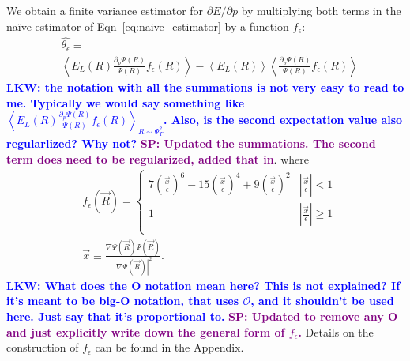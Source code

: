 \documentclass[twocolumn]{revtex4-1}
\newcommand{\lucas}[1]{\textbf{\textcolor{blue}{LKW: #1}}}
\newcommand{\shivesh}[1]{\textbf{\textcolor{purple}{SP: #1}}}
\begin{document}
We obtain a finite variance estimator for $\partial E/\partial p$ by multiplying both terms in the na\"ive estimator of Eqn~\ref{eq:naive_estimator} by a function $f_\epsilon$:
\begin{equation}
\begin{split}
&\hat{\theta_\epsilon} \equiv \\ 
&\left\langle E_L(R) \frac{\partial_p \Psi(R)}{\Psi(R)} f_\epsilon(R) \right\rangle - \left\langle E_L(R) \right \rangle \left \langle \frac{\partial_p \Psi(R)}{\Psi(R)} f_\epsilon(R) \right\rangle
\label{eq:regularized_estimator}
\end{split}
\end{equation}
\lucas{the notation with all the summations is not very easy to read to me. Typically we would say something like $\left\langle E_L(R) \frac{\partial_p \Psi(R)}{\Psi(R)} f_\epsilon(R) \right\rangle_{R\sim\Psi_T^2}$. Also, is the second expectation value also regularlized? Why not?}
\shivesh{Updated the summations. The second term does need to be regularized, added that in}.
where 
\begin{equation}
\begin{split}
&f_\epsilon(\vec{R}) = \begin{cases} 
     7(\frac{\vec{x}}{\epsilon})^6 - 15(\frac{\vec{x}}{\epsilon})^4 + 9(\frac{\vec{x}}{\epsilon})^2 & |\frac{\vec{x}}{\epsilon}| < 1 \\
      1 & |\frac{\vec{x}}{\epsilon}| \ge 1 \\
   \end{cases}\\ 
 &\vec{x} \equiv \frac{\nabla \Psi(\vec{R}) \Psi(\vec{R})}{|\nabla \Psi(\vec{R})|^2}.
\end{split}
\label{eq:regularizing_function}
\end{equation} 
\lucas{What does the O notation mean here? This is not explained? If it's meant to be big-O notation, that uses $\mathcal{O}$, and it shouldn't be used here. Just say that it's proportional to.} 
\shivesh{Updated to remove any O and just explicitly write down the general form of $f_\epsilon$.}
Details on the construction of $f_\epsilon$ can be found in the Appendix.
\end{document}
